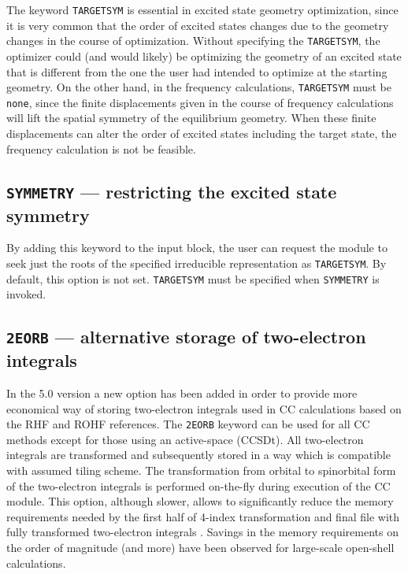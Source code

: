 The keyword \verb+TARGETSYM+ is essential in excited state geometry
optimization, since it is very common that the order of excited states changes due to
the geometry changes in the course of optimization.  Without specifying the \verb+TARGETSYM+,
the optimizer could (and would likely) be optimizing the geometry of an excited state that
is different from the one the user had intended to optimize at the starting geometry.
On the other hand, in the frequency calculations, \verb+TARGETSYM+ must be \verb+none+,
since the finite displacements given in the course of frequency calculations will lift
the spatial symmetry of the equilibrium geometry.  When these finite displacements can
alter the order of excited states including the target state, the frequency calculation
is not be feasible.

\subsection{{\tt SYMMETRY} --- restricting the excited state symmetry}
 
By adding this keyword to the input block, the user can request the module to
seek just the roots of the specified irreducible representation as 
\verb+TARGETSYM+.  By default, this option is not set.
\verb+TARGETSYM+ must be specified when \verb+SYMMETRY+ is invoked.

\subsection{{\tt 2EORB} --- alternative storage of two-electron integrals}

In the 5.0 version a new option has been added in order to provide more economical 
way of  storing two-electron integrals used in CC calculations based on the  RHF and ROHF 
references. The {\tt 2EORB} keyword can be used for all CC methods except for those 
using an active-space (CCSDt).  All two-electron integrals are
transformed and subsequently stored in a way which is compatible with assumed tiling scheme. 
The transformation from orbital to spinorbital form of the two-electron integrals is 
performed on-the-fly during execution of the CC module. This option, although slower, allows  
to significantly reduce the memory requirements needed by  the first half of 4-index 
transformation and final file with fully transformed two-electron integrals . 
Savings in the memory requirements on the order of magnitude (and more)
have been observed for large-scale open-shell calculations.

